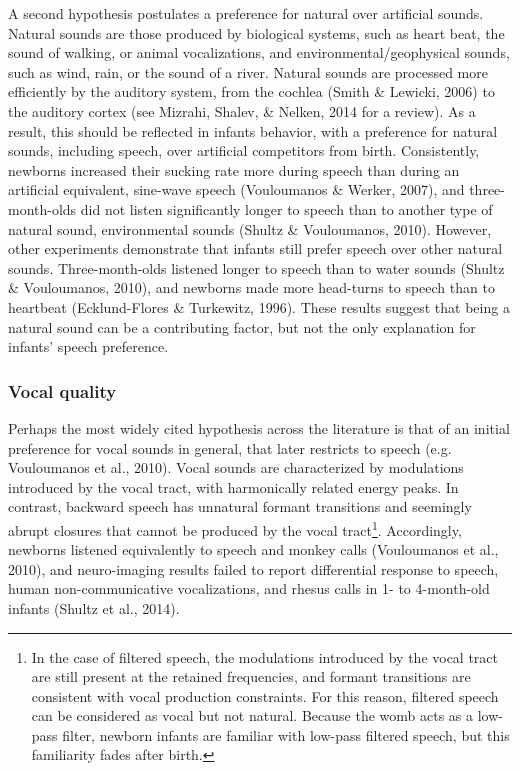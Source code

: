 \documentclass[man]{apa6}
\let\rmarkdownfootnote\footnote%
\def\footnote{\protect\rmarkdownfootnote}
\begin{document}
A second hypothesis postulates a preference for natural over artificial
sounds. Natural sounds are those produced by biological systems, such as
heart beat, the sound of walking, or animal vocalizations, and
environmental/geophysical sounds, such as wind, rain, or the sound of a
river. Natural sounds are processed more efficiently by the auditory
system, from the cochlea (Smith \& Lewicki, 2006) to the auditory cortex
(see Mizrahi, Shalev, \& Nelken, 2014 for a review). As a result, this
should be reflected in infants behavior, with a preference for natural
sounds, including speech, over artificial competitors from birth.
Consistently, newborns increased their sucking rate more during speech
than during an artificial equivalent, sine-wave speech (Vouloumanos \&
Werker, 2007), and three-month-olds did not listen significantly longer
to speech than to another type of natural sound, environmental sounds
(Shultz \& Vouloumanos, 2010). However, other experiments demonstrate
that infants still prefer speech over other natural sounds.
Three-month-olds listened longer to speech than to water sounds (Shultz
\& Vouloumanos, 2010), and newborns made more head-turns to speech than
to heartbeat (Ecklund-Flores \& Turkewitz, 1996). These results suggest
that being a natural sound can be a contributing factor, but not the
only explanation for infants' speech preference.

\subsubsection{Vocal quality}\label{vocal-quality}

Perhaps the most widely cited hypothesis across the literature is that
of an initial preference for vocal sounds in general, that later
restricts to speech (e.g. Vouloumanos et al., 2010). Vocal sounds are
characterized by modulations introduced by the vocal tract, with
harmonically related energy peaks. In contrast, backward speech has
unnatural formant transitions and seemingly abrupt closures that cannot
be produced by the vocal tract\footnote{In the case of filtered speech,
  the modulations introduced by the vocal tract are still present at the
  retained frequencies, and formant transitions are consistent with
  vocal production constraints. For this reason, filtered speech can be
  considered as vocal but not natural. Because the womb acts as a
  low-pass filter, newborn infants are familiar with low-pass filtered
  speech, but this familiarity fades after birth.}. Accordingly,
newborns listened equivalently to speech and monkey calls (Vouloumanos
et al., 2010), and neuro-imaging results failed to report differential
response to speech, human non-communicative vocalizations, and rhesus
calls in 1- to 4-month-old infants (Shultz et al., 2014).
\end{document}
